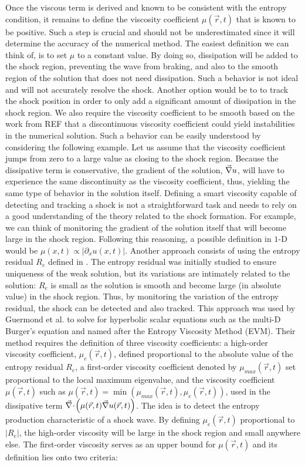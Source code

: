 Once the viscous term is derived and known to be consistent with the entropy condition, it remains to define the viscosity coefficient $\mu(\vec{r},t)$ that is known to be positive. Such a step is crucial and should not be underestimated since it will determine the accuracy of the numerical method. The easiest definition we can think of, is to set $\mu$ to a constant value. By doing so, dissipation will be added to the shock region, preventing the wave from braking, and also to the smooth region of the solution that does not need dissipation. Such a behavior is not ideal and will not accurately resolve the shock. Another option would be to to track the shock position in order to only add a significant amount of dissipation in the shock region. We also require the viscosity coefficient to be smooth based on the work from REF that a discontinuous viscosity coefficient could yield instabilities in the numerical solution. Such a behavior can be easily understood by considering the following example. Let us assume that the viscosity coefficient jumps from zero to a large value as closing to the shock region. Because the dissipative term is conservative, the gradient of the solution, $\vec{\nabla} u$, will have to experience the same discontinuity as the viscosity coefficient, thus, yielding the same type of behavior in the solution itself.   
Defining a smart viscosity capable of detecting and tracking a shock is not a straightforward task and needs to rely on a good understanding of the theory related to the shock formation. For example, we can think of monitoring the gradient of the solution itself that will become large in the shock region. Following this reasoning, a possible definition in $1$-D would be $\mu(x,t) \propto \left| \partial_x u(x,t) \right|$. Another approach consists of using the entropy residual $R_e$ defined in . The entropy residual was initially studied to ensure uniqueness of the weak solution, but its variations are intimately related to the solution: $R_e$ is small as the solution is smooth and become large (in absolute value) in the shock region. Thus, by monitoring the variation of the entropy residual, the shock can be detected and also tracked. This approach was used by Guermond et al. \cite{jlg1, jlg2, jlg3} to solve for hyperbolic scalar equations such as the multi-D Burger's equation and named after the Entropy Viscosity Method (EVM). Their method requires the definition of three viscosity coefficients: a high-order viscosity coefficient, $\mu_e(\vec{r},t)$, defined proportional to the absolute value of the entropy residual $R_e$,  a first-order viscosity coefficient denoted by $\mu_{max}(\vec{r},t)$ set proportional to the local maximum eigenvalue, and the viscosity coefficient $\mu(\vec{r},t)$ such as $\mu(\vec{r},t) = \min \left( \mu_{max}(\vec{r},t), \mu_e(\vec{r},t) \right)$, used in the dissipative term $\vec{\nabla}\! \cdot \! \left( \mu(\vec{r},t) \vec{\nabla} u(\vec{r},t) \right)$. The idea is to detect the entropy production characteristic of a shock wave. By defining $\mu_e(\vec{r},t)$ proportional to $\left| R_e \right|$, the high-order viscosity will be large in the shock region and small anywhere else. The first-order viscosity serves as an upper bound for $\mu(\vec{r},t)$ and its definition lies onto two criteria:
